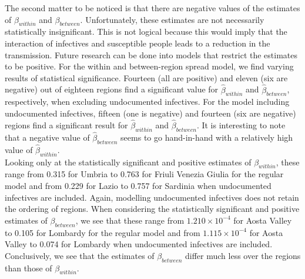 \documentclass[12pt]{article}
\begin{document}
	The second matter to be noticed is that there are negative values of the estimates of $\beta_{within}$ and $\beta_{between}$. Unfortunately, these estimates are not necessarily statistically insignificant. This is not logical because this would imply that the interaction of infectives and susceptible people leads to a reduction in the transmission. Future research can be done into models that restrict the estimates to be positive. For the within and between-region spread model, we find varying results of statistical significance. Fourteen (all are positive) and eleven (six are negative) out of eighteen regions find a significant value for $\widehat{\beta}_{within}$ and $\widehat{\beta}_{between}$, respectively, when excluding undocumented infectives. For the model including undocumented infectives, fifteen (one is negative) and fourteen (six are negative) regions find a significant result for $\widehat{\beta}_{within}$ and $\widehat{\beta}_{between}$. It is interesting to note that a negative value of $\widehat{\beta}_{between}$ seems to go hand-in-hand with a relatively high value of $\widehat{\beta}_{within}$. \\
	
	
	Looking only at the statistically significant and positive estimates of $\beta_{within}$, these range from 0.315 for Umbria to 0.763 for Friuli Venezia Giulia for the regular model and from 0.229 for Lazio to 0.757 for Sardinia when undocumented infectives are included. Again, modelling undocumented infectives does not retain the ordering of regions. When considering the statistically significant and positive estimates of $\beta_{between}$, we see that these range from $1.210 \times 10^{-4}$ for Aosta Valley to 0.105 for Lombardy for the regular model and from $1.115 \times 10^{-4}$ for Aosta Valley to 0.074 for Lombardy when undocumented infectives are included. Conclusively, we see that the estimates of $\beta_{between}$ differ much less over the regions than those of $\beta_{within}$. \\
	
\end{document}
